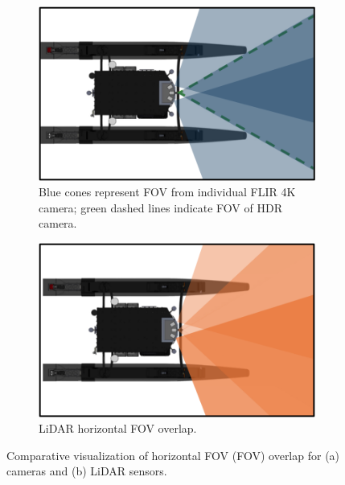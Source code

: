 \documentclass{erauthesis}
\begin{document}
\begin{figure}[htbp]
\centering
\begin{subfigure}[t]{0.48\textwidth}
    \centering
    \includegraphics[width=\textwidth]{Images/fov_cam.png}
    \caption{Blue cones represent \ac{FOV} from individual FLIR 4K camera; green dashed lines indicate \ac{FOV} of HDR camera.}
    \label{fig:fov_cam}
\end{subfigure}
\hfill
\begin{subfigure}[t]{0.48\textwidth}
    \centering
    \includegraphics[width=\textwidth]{Images/fov_lidar.png}
    \caption{LiDAR horizontal \ac{FOV} overlap.}
    \label{fig:fov_lidar}
\end{subfigure}
\caption{Comparative visualization of horizontal \ac{FOV} (FOV) overlap for (a) cameras and (b) LiDAR sensors.}
\label{fig:fov_combined}
\end{figure}

\end{document}
